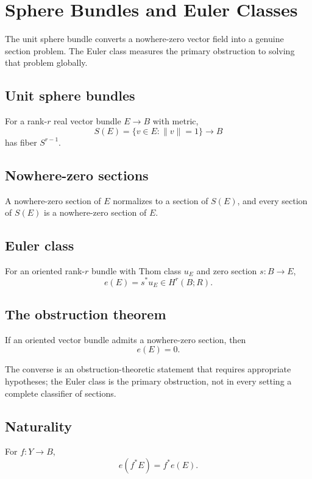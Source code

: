 
\chapter{Sphere Bundles and Euler Classes}
\label{ch:viii32-sphere-bundles-euler}

The unit sphere bundle converts a nowhere-zero vector field into a genuine
section problem.  The Euler class measures the primary obstruction to solving
that problem globally.

\section{Unit sphere bundles}
For a rank-$r$ real vector bundle $E\to B$ with metric,
\[
S(E)=\{v\in E:\|v\|=1\}\longrightarrow B
\]
has fiber $S^{r-1}$.

\section{Nowhere-zero sections}
A nowhere-zero section of $E$ normalizes to a section of $S(E)$, and every
section of $S(E)$ is a nowhere-zero section of $E$.

\section{Euler class}
\begin{definition}
\label{def:viii32-euler-class}
For an oriented rank-$r$ bundle with Thom class $u_E$ and zero section
$s:B\to E$,
\[
e(E)=s^*u_E\in H^r(B;R).
\]
\end{definition}

\section{The obstruction theorem}
\begin{theorem}
\label{thm:viii32-euler-obstruction}
If an oriented vector bundle admits a nowhere-zero section, then
\[
e(E)=0.
\]
\end{theorem}
The converse is an obstruction-theoretic statement that requires appropriate
hypotheses; the Euler class is the primary obstruction, not in every setting a
complete classifier of sections.

\section{Naturality}
For $f:Y\to B$,
\[
e(f^*E)=f^*e(E).
\]


